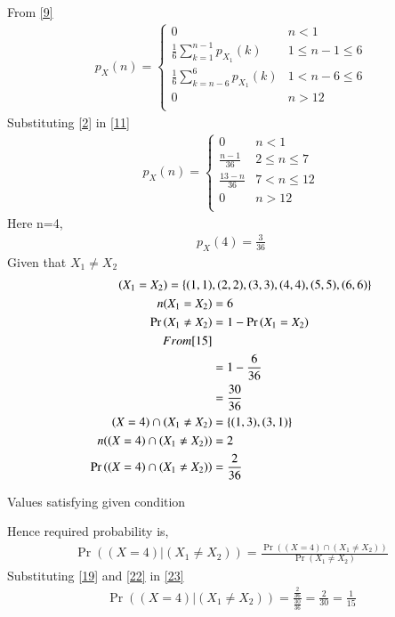 \documentclass[journal,12pt,twocolumn]{IEEEtran}
\providecommand{\pr}[1]{\ensuremath{\Pr\left(#1\right)}}
\theoremstyle{remark}
\begin{document}
From \eqref{9}
\begin{align}
  p_X(n) =
  \begin{cases}
  0 & n < 1 \\
  \frac{1}{6}\sum_{k=1}^{n-1}p_{X_1}(k) & 1 \leq n-1 \leq 6 \\
  \frac{1}{6}\sum_{k=n-6}^{6}p_{X_1}(k) & 1 < n-6 \leq 6 \\
  0 & n > 12 \\
  \end{cases}
  \label{11}
  \end{align}
  Substituting \eqref{2} in \eqref{11}
  \begin{align}
  p_X(n) =
  \begin{cases}
  0 & n < 1 \\
  \frac{n-1}{36} & 2 \leq n \leq 7 \\
  \frac{13-n}{36} & 7 < n \leq 12 \\
  0 & n > 12 \\
  \end{cases}
  \end{align}
  Here n=4,
  \begin{align}
  p_X(4)=\frac{3}{36} 
  \end{align}
   Given that $ X_1 \neq X_2 $
\begin{align}
  (X_1=X_2)=\{(1,1)&,(2,2),(3,3),(4,4),(5,5),(6,6)\} \\
  n(X_1=X_2)&=6  \label{15} \\
\pr{X_1 \neq X_2}&=1-\pr{X_1=X_2} \\
From \eqref{15} \\
&=1-\frac{6}{36}  \\
&=\frac{30}{36}  \label{19} \\
{(X=4)} \cap (X_1 \neq X_2)&=\{(1,3),(3,1)\} \\
n({(X=4)} \cap (X_1 \neq X_2))&=2 \\ 
\pr{(X=4) \cap (X_1 \neq X_2)}&=\frac{2}{36} \label{22}
\end{align}
\begin{table}[htbp]
  \label{tab:ncert/12/13/6/5/1}
  
  \caption{Values satisfying given condition}
  \end{table} 
  
Hence required probability is,
\begin{align}
\pr{(X=4)|(X_1 \neq X_2)}=\frac{\pr{(X=4) \cap (X_1 \neq X_2)}}{\pr{X_1 \neq X_2}} \label{23}
\end{align}
Substituting \eqref{19} and \eqref{22} in \eqref{23}
\begin{align}
\pr{(X=4)|(X_1 \neq X_2)}=\frac{\frac{2}{36}}{\frac{30}{36}}=\frac{2}{30}=\frac{1}{15}
\end{align}
\end{document}
